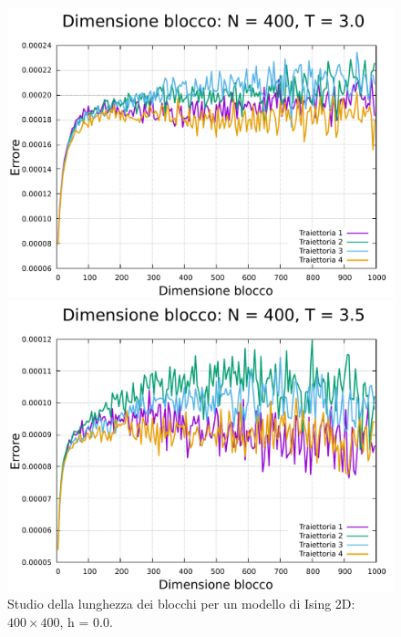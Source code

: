 \begin{figure}[H]
    \begin{minipage}{0.45\textwidth}  
      \centering
      \includegraphics[page=1, width=\textwidth]{Immagini/simIsing2D/metro/lblk/err_400_3.0.pdf}
      \caption{$T\,=\,3.0$}
    \end{minipage}\hfill
    \begin{minipage}{0.45\textwidth}  
      \centering
      \includegraphics[page=1, width=\textwidth]{Immagini/simIsing2D/metro/lblk/err_400_3.5.pdf}
      \caption{$T\,=\,3.5$}
    \end{minipage}
    \caption{Studio della lunghezza dei blocchi per un modello di Ising 2D: $400 \times 400$, h = 0.0.}
\end{figure}

